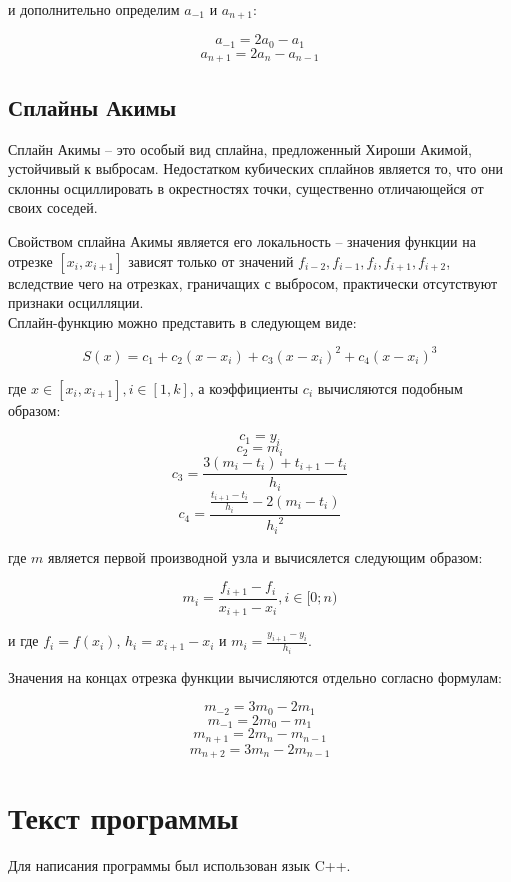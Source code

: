 \documentclass[12pt]{article}
\begin{document}
	и дополнительно определим $a_{-1}$ и $a_{n+1}$:
	
		$$a_{-1}=2a_0-a_1$$
		$$a_{n+1}=2a_n-a_{n-1}$$
    	{
    		\subsection{Сплайны Акимы}
    	}
    
	Сплайн Акимы – это особый вид сплайна, предложенный Хироши Акимой, устойчивый к выбросам. Недостатком кубических сплайнов является то, что они склонны осциллировать в окрестностях точки, существенно отличающейся от своих соседей.
	
	Свойством сплайна Акимы является его локальность – значения функции на отрезке $[x_i, x_{i+1}]$ зависят только от значений $f_{i-2}, f_{i-1}, f_i, f_{i+1}, f_{i+2}$, вследствие чего на отрезках, граничащих с выбросом, практически отсутствуют признаки осцилляции. \\
	
	Сплайн-функцию можно представить в следующем виде:
	
		$$ S(x) = c_1 + c_2(x-x_{i})+c_3(x-x_{i})^2+c_4(x-x_{i})^3$$ 
	
	где $x \in [x_i, x_{i+1}], i \in [1, k]$, а коэффициенты $c_i$ вычисляются подобным образом:
	
		$$c_1 = y_i$$
		$$c_2 = m_i$$
		$$c_3 = \frac{3(m_i - t_i) + t_{i+1} - t_i}{h_i}$$
		$$c_4 = \frac{\frac{t_{i+1}-t_i}{h_i}-2(m_i-t_i)}{{h_i}^2}$$
	
	где $m$ является первой производной узла и вычисялется следующим образом:
	
		$$m_{i}=\frac{f_{i+1}-f_i}{x_{i+1}-x_i}, i \in [0; n)$$
		
	 и где $f_i=f(x_i)$, $h_i=x_{i+1}-x_i$ и $m_i=\frac{y_{i+1}-y_i}{h_i}$.
		
	Значения на концах отрезка функции вычисляются отдельно согласно формулам:
	
		$$m_{-2}=3m_0-2m_1$$
		$$m_{-1}=2m_0-m_1$$
		$$m_{n+1}=2m_{n}-m_{n-1}$$
		$$m_{n+2}=3m_{n}-2m_{n-1}$$
		
	
	
	
	
	
    
    {
        \section{Текст программы}
    }
    
    Для написания программы был использован язык C++.
    
\end{document}
